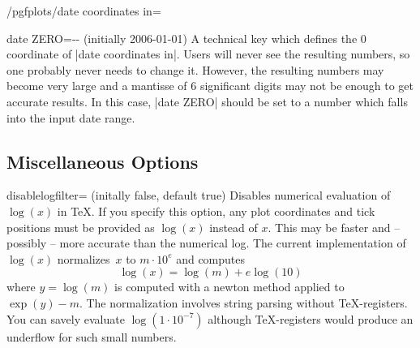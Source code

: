\begin{stylekey}{/pgfplots/date coordinates in=}
\begin{codeexample}[]
\end{codeexample}
\end{stylekey}

\begin{pgfplotskey}{date ZERO=-- (initially 2006-01-01)}
	A technical key which defines the $0$ coordinate of |date coordinates in|. Users will never see the resulting numbers, so one probably never needs to change it. However, the resulting numbers may become very large and a mantisse of 6 significant digits may not be enough to get accurate results. In this case, |date ZERO| should be set to a number which falls into the input date range.
\end{pgfplotskey}




\subsection{Miscellaneous Options}
\label{pgfplots:misc}

\begin{pgfplotskey}{disablelogfilter= (initally false, default true)}
Disables numerical evaluation of $\log(x)$ in \TeX. If you specify this option, any plot coordinates and tick positions must be provided as $\log(x)$ instead of $x$. This may be faster and -- possibly -- more accurate than the numerical log. The current implementation of $\log(x)$ normalizes~$x$ to $m\cdot 10^e$ and computes
\[ \log(x) = \log(m) + e \log(10) \]
where $y = \log(m)$ is computed with a newton method applied to $\exp(y) - m$. The normalization involves string parsing without \TeX-registers. You can savely evaluate $\log(1\cdot 10^{-7})$ although \TeX-registers would produce an underflow for such small numbers. 
\end{pgfplotskey}

